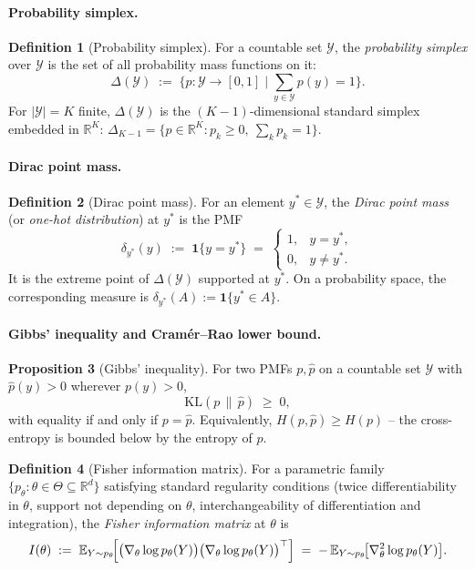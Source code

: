 \documentclass[11pt]{article}
\theoremstyle{definition}
\newtheorem{definition}{Definition}
\newtheorem{proposition}[definition]{Proposition}
\begin{document}
\paragraph{Probability simplex.}

\begin{definition}[Probability simplex]
For a countable set $\mathcal{Y}$, the \emph{probability simplex} over
$\mathcal{Y}$ is the set of all probability mass functions on it:
\[
  \Delta(\mathcal{Y}) \;:=\; \biggl\{ p : \mathcal{Y} \to [0, 1] \;\Big|\;
    \sum_{y \in \mathcal{Y}} p(y) = 1 \biggr\}.
\]
For $|\mathcal{Y}| = K$ finite, $\Delta(\mathcal{Y})$ is the $(K-1)$-dimensional
standard simplex embedded in $\mathbb{R}^{K}$:
\(
  \Delta_{K-1}
  = \{p \in \mathbb{R}^{K} : p_k \geq 0,\ \sum_k p_k = 1\}.
\)
\end{definition}

\paragraph{Dirac point mass.}

\begin{definition}[Dirac point mass]
For an element $y^{\ast} \in \mathcal{Y}$, the \emph{Dirac point mass} (or
\emph{one-hot distribution}) at $y^{\ast}$ is the PMF
\[
  \delta_{y^{\ast}}(y) \;:=\; \mathbf{1}\{y = y^{\ast}\}
  \;=\; \begin{cases} 1, & y = y^{\ast},\\ 0, & y \neq y^{\ast}. \end{cases}
\]
It is the extreme point of $\Delta(\mathcal{Y})$ supported at $y^{\ast}$.
On a probability space, the corresponding measure is
$\delta_{y^{\ast}}(A) := \mathbf{1}\{y^{\ast} \in A\}$.
\end{definition}

\paragraph{Gibbs' inequality and Cram\'er--Rao lower bound.}

\begin{proposition}[Gibbs' inequality]
For two PMFs $p, \hat p$ on a countable set $\mathcal{Y}$ with $\hat p(y) > 0$
wherever $p(y) > 0$,
\[
  \mathrm{KL}(p \,\|\, \hat p) \;\geq\; 0,
\]
with equality if and only if $p = \hat p$. Equivalently,
$H(p, \hat p) \geq H(p)$ -- the cross-entropy is bounded below by the entropy
of $p$.
\end{proposition}

\begin{definition}[Fisher information matrix]
For a parametric family $\{p_\theta : \theta \in \Theta \subseteq \mathbb{R}^{d}\}$
satisfying standard regularity conditions (twice differentiability in $\theta$,
support not depending on $\theta$, interchangeability of differentiation and
integration), the \emph{Fisher information matrix} at $\theta$ is
\[
  I(\theta) \;:=\; \mathbb{E}_{Y \sim p_\theta}\!\Bigl[
    \bigl(\nabla_\theta \log p_\theta(Y)\bigr)\bigl(\nabla_\theta \log p_\theta(Y)\bigr)^{\top}
  \Bigr]
  \;=\; -\,\mathbb{E}_{Y \sim p_\theta}\!\bigl[\nabla_\theta^{2} \log p_\theta(Y)\bigr].
\]
\end{definition}
\end{document}
